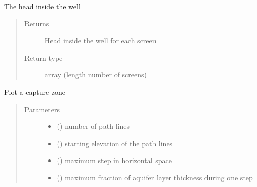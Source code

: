 \documentclass[letterpaper,10pt,english]{sphinxmanual}
\begin{document}
\begin{fulllineitems}
\begin{fulllineitems}
\begin{quote}
\begin{description}
\end{description}\end{quote}

\end{fulllineitems}


\begin{fulllineitems}
\label{\detokenize{wells/well:timml.well.Well.headinside}}
The head inside the well
\begin{quote}\begin{description}
\item[{Returns}] \leavevmode
Head inside the well for each screen

\item[{Return type}] \leavevmode
array (length number of screens)

\end{description}\end{quote}

\end{fulllineitems}


\begin{fulllineitems}
\label{\detokenize{wells/well:timml.well.Well.plotcapzone}}
Plot a capture zone
\begin{quote}\begin{description}
\item[{Parameters}] \leavevmode\begin{itemize}
\item {} 
 () \textendash{} number of path lines

\item {} 
 () \textendash{} starting elevation of the path lines

\item {} 
 () \textendash{} maximum step in horizontal space

\item {} 
 () \textendash{} maximum fraction of aquifer layer thickness during one step


\end{itemize}
\end{description}
\end{quote}
\end{fulllineitems}
\end{fulllineitems}
\end{document}
